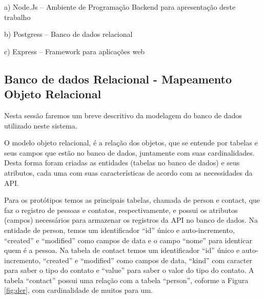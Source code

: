     \begin{compactitem}
      \item[a)] Node.Js – Ambiente de Programação Backend para apresentação deste trabalho
      \item[b)] Postgress – Banco de dados relacional
      \item[c)] Express – Framework para aplicações web
    \end{compactitem}
  

  
\subsection{Banco de dados Relacional - Mapeamento Objeto Relacional}
\label{banco-de-dados}

  Nesta sessão faremos um breve descritivo da modelagem do banco de
  dados utilizado neste sistema.
  
  O modelo objeto relacional, é a relação dos objetos, que se entende por tabelas e seus campos que estão 
  no banco de dados, juntamente com suas cardinalidades. Desta forma foram criadas as entidades
  (tabelas no banco de dados) e seus atributos, cada uma com suas características de
  acordo com as necessidades da \ac{API}.
  
  Para os protótipos temos as principais tabelas, chamada de person e contact,
  que faz o registro de pessoas e contatos, respectivamente, e possui os atributos (campos) necessários
  para armazenar os registros da \ac{API} no banco de dados. Na entidade de person, temos um identificador
  ``id'' único e auto-incremento, ``created'' e ``modified'' como campos de data e o campo
  ``nome'' para identicar quem é a pessoa. Na tabela de contact temos um identificador ``id'' único e auto-incremento,
  ``created'' e ``modified'' como campos de data, ``kind'' com caracter para saber o tipo do contato e ``value'' para 
  saber o valor do tipo do contato. A tabela ``contact'' possui uma relação com a tabela ``person'', coforme a Figura 
  \ref{fig:der}, com cardinalidade de muitos para um.

